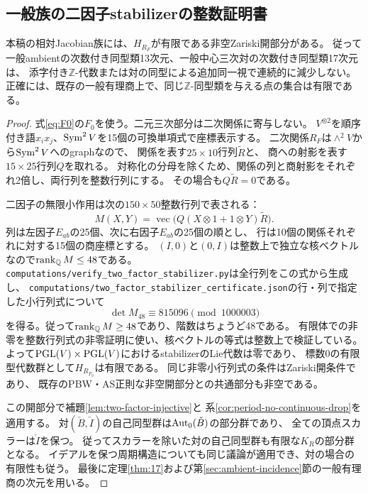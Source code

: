 \subsection{一般族の二因子stabilizerの整数証明書}
\begin{theorem}[一般ambientの有限な二因子stabilizer]\label{thm:generic-two-factor-finite}
本稿の相対Jacobian族には、$H_{R_F}$が有限である非空Zariski開部分がある。
従って一般ambientの次数付き同型類13次元、一般中心三次対の次数付き同型類17次元は、
添字付き$\mathbb Z$-代数または対の同型による追加同一視で連続的に減少しない。
正確には、既存の一般有理商上で、同じ$\mathbb Z$-同型類を与える点の集合は有限である。
\end{theorem}
\begin{proof}
式\eqref{eq:F0}の$F_0$を使う。二元三次部分は二次関係に寄与しない。
$V^{\otimes2}$を順序付き語$x_ix_j$、$\operatorname{Sym}^2V$を15個の可換単項式で座標表示する。
二次関係$R_F$は$\wedge^2V$から$\operatorname{Sym}^2V$へのgraphなので、
関係を表す$25\times10$行列$\widetilde R$と、
商への射影を表す$15\times25$行列$Q$を取れる。
対称化の分母を除くため、関係の列と商射影をそれぞれ2倍し、両行列を整数行列にする。
その場合も$Q\widetilde R=0$である。

二因子の無限小作用は次の$150\times50$整数行列で表される：
\begin{equation}\label{eq:two-factor-lie-matrix}
 M(X,Y)=\operatorname{vec}
       \bigl(Q(X\otimes1+1\otimes Y)\widetilde R\bigr).
\end{equation}
列は左因子$E_{ab}$の25個、次に右因子$E_{ab}$の25個の順とし、
行は10個の関係それぞれに対する15個の商座標とする。
$(I,0)$と$(0,I)$は整数上で独立な核ベクトルなので$\operatorname{rank}_{\mathbb Q}M\le48$である。
\nolinkurl{computations/verify_two_factor_stabilizer.py}は全行列をこの式から生成し、
\nolinkurl{computations/two_factor_stabilizer_certificate.json}の行・列で指定した小行列式について
\begin{equation}\label{eq:two-factor-nonzero-minor}
 \det M_{48}\equiv815096\pmod{1000003}
\end{equation}
を得る。従って$\operatorname{rank}_{\mathbb Q}M\ge48$であり、階数はちょうど48である。
有限体での非零を整数行列式の非零証明に使い、核ベクトルの等式は整数上で検証している。
よって$\mathrm{PGL}(V)\times\mathrm{PGL}(V)$におけるstabilizerのLie代数は零であり、
標数0の有限型代数群として$H_{R_{F_0}}$は有限である。
同じ非零小行列式の条件はZariski開条件であり、
既存のPBW・AS正則な非空開部分との共通部分も非空である。

この開部分で補題\ref{lem:two-factor-injective}と
系\ref{cor:period-no-continuous-drop}を適用する。
対$(\check B,\check I)$の自己同型群は$\operatorname{Aut}_0(\check B)$の部分群であり、
全ての頂点スカラーは$\check I$を保つ。
従ってスカラーを除いた対の自己同型群も有限な$K_R$の部分群となる。
イデアルを保つ周期構造についても同じ議論が適用でき、対の場合の有限性も従う。
最後に定理\ref{thm:17}および第\ref{sec:ambient-incidence}節の一般有理商の次元を用いる。
\end{proof}

